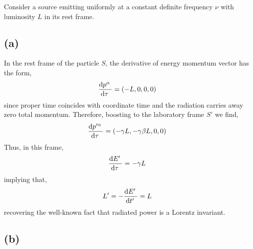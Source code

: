 \documentclass[12pt]{article}
\begin{document}
Consider a source emitting uniformly at a constant definite frequency $\nu$ with luminosity $L$ in its rest frame.   

\subsection*{(a)}

In the rest frame of the particle $S$, the derivative of energy momentum vector has the form,
\[ \frac{\mathrm{d}p^\alpha \:}{\mathrm{d}\tau \:} = (-L, 0, 0, 0) \]
since proper time coincides with coordinate time and the radiation carries away zero total momentum. Therefore, boosting to the laboratory frame $S'$ we find,
\[ \frac{\mathrm{d}p'^\alpha \:}{\mathrm{d}\tau \:} = (-\gamma L, -\gamma \beta L, 0, 0) \]
Thus, in this frame,
\[ \frac{\mathrm{d}E' \:}{\mathrm{d}\tau \:} = - \gamma L \]
implying that,
\[ L' = - \frac{\mathrm{d}E' \:}{\mathrm{d}t' \:} = L \]
recovering the well-known fact that radiated power is a Lorentz invariant. 

\subsection*{(b)}
\end{document}
